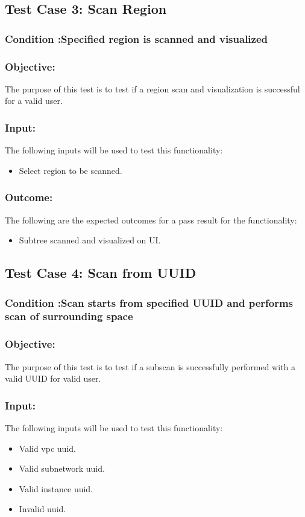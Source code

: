 \documentclass[hidelinks,a4paper,12pt]{article}
\begin{document}
\subsection{Test Case 3: Scan Region }
\subsubsection{Condition :Specified region  is scanned and visualized}
\subsubsection{Objective:} The purpose of this test is to test if a region scan and visualization is successful for a valid user.

\subsubsection{Input:}
 The following inputs will be used to test this functionality:
\begin{itemize}
  \item Select region to be scanned.
\end{itemize}
\subsubsection{Outcome: }
The following are the expected outcomes for a pass result for the functionality:
\begin{itemize}
\item Subtree scanned and visualized on UI.
\end{itemize}


\subsection{Test Case 4: Scan from UUID}
\subsubsection{Condition :Scan starts from specified UUID and performs scan of surrounding space}
\subsubsection{Objective:} The purpose of this test is to test if a subscan is successfully performed with a valid UUID for valid user.

\subsubsection{Input:}
 The following inputs will be used to test this functionality:
\begin{itemize}
  \item Valid vpc uuid.
  \item Valid subnetwork uuid.
 \item Valid instance uuid.
\item Invalid uuid.

\end{itemize}
\end{document}
